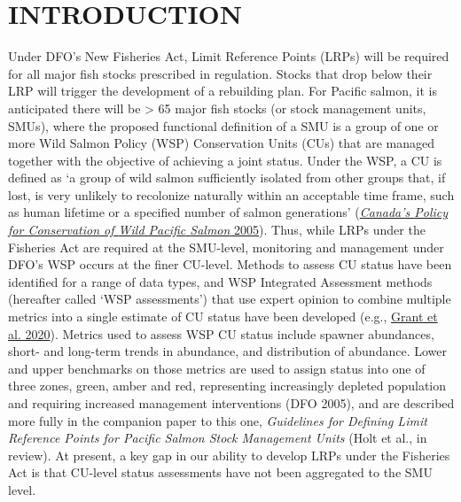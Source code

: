 \documentclass[11pt]{book}
\begin{document}
\frontmatter

\hypertarget{introduction}{%
\section{INTRODUCTION}\label{introduction}}

Under DFO's New Fisheries Act, Limit Reference Points (LRPs) will be required for all major fish stocks prescribed in regulation. Stocks that drop below their LRP will trigger the development of a rebuilding plan. For Pacific salmon, it is anticipated there will be \textgreater{} 65 major fish stocks (or stock management units, SMUs), where the proposed functional definition of a SMU is a group of one or more Wild Salmon Policy (WSP) Conservation Units (CUs) that are managed together with the objective of achieving a joint status. Under the WSP, a CU is defined as `a group of wild salmon sufficiently isolated from other groups that, if lost, is very unlikely to recolonize naturally within an acceptable time frame, such as human lifetime or a specified number of salmon generations' (\protect\hyperlink{ref-dfoCanadaPolicyConservation2005}{\emph{Canada's {Policy} for {Conservation} of {Wild} {Pacific} {Salmon}} 2005}). Thus, while LRPs under the Fisheries Act are required at the SMU-level, monitoring and management under DFO's WSP occurs at the finer CU-level. Methods to assess CU status have been identified for a range of data types, and WSP Integrated Assessment methods (hereafter called `WSP assessments') that use expert opinion to combine multiple metrics into a single estimate of CU status have been developed (e.g., \protect\hyperlink{ref-grant2017FraserSockeye2020}{Grant et al. 2020}). Metrics used to assess WSP CU status include spawner abundances, short- and long-term trends in abundance, and distribution of abundance. Lower and upper benchmarks on those metrics are used to assign status into one of three zones, green, amber and red, representing increasingly depleted population and requiring increased management interventions (DFO 2005), and are described more fully in the companion paper to this one, \emph{Guidelines for Defining Limit Reference Points for Pacific Salmon Stock Management Units} (Holt et al., in review). At present, a key gap in our ability to develop LRPs under the Fisheries Act is that CU-level status assessments have not been aggregated to the SMU level.
\end{document}
